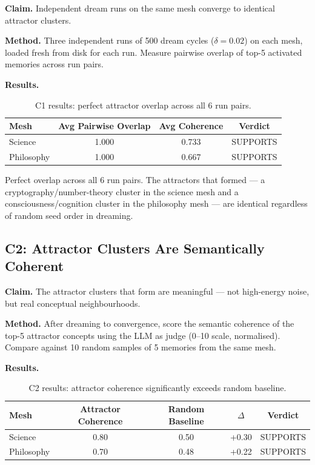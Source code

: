 \documentclass[11pt]{article}
\begin{document}
\textbf{Claim.} Independent dream runs on the same mesh converge to identical
attractor clusters.

\textbf{Method.} Three independent runs of 500 dream cycles ($\delta=0.02$)
on each mesh, loaded fresh from disk for each run. Measure pairwise overlap of
top-5 activated memories across run pairs.

\textbf{Results.}

\begin{table}[h]
\centering
\begin{tabular}{lccc}
\toprule
Mesh & Avg Pairwise Overlap & Avg Coherence & Verdict \\
\midrule
Science    & 1.000 & 0.733 & SUPPORTS \\
Philosophy & 1.000 & 0.667 & SUPPORTS \\
\bottomrule
\end{tabular}
\caption{C1 results: perfect attractor overlap across all 6 run pairs.}
\end{table}

Perfect overlap across all 6 run pairs. The attractors that formed --- a
cryptography/number-theory cluster in the science mesh and a
consciousness/cognition cluster in the philosophy mesh --- are identical
regardless of random seed order in dreaming.

\subsection{C2: Attractor Clusters Are Semantically Coherent}

\textbf{Claim.} The attractor clusters that form are meaningful --- not
high-energy noise, but real conceptual neighbourhoods.

\textbf{Method.} After dreaming to convergence, score the semantic coherence
of the top-5 attractor concepts using the LLM as judge (0--10 scale,
normalised). Compare against 10 random samples of 5 memories from the same
mesh.

\textbf{Results.}

\begin{table}[h]
\centering
\begin{tabular}{lcccc}
\toprule
Mesh & Attractor Coherence & Random Baseline & $\Delta$ & Verdict \\
\midrule
Science    & 0.80 & 0.50 & +0.30 & SUPPORTS \\
Philosophy & 0.70 & 0.48 & +0.22 & SUPPORTS \\
\bottomrule
\end{tabular}
\caption{C2 results: attractor coherence significantly exceeds random baseline.}
\end{table}
\end{document}
